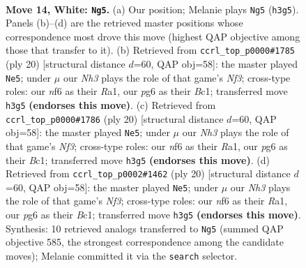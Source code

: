 \documentclass[11pt]{article}
\begin{document}
\clearpage

\begin{figure}[p]\centering
\begin{subfigure}{0.46\textwidth}\centering
\resizebox{\linewidth}{!}{%
\newchessgame
\chessboard[
  setfen={rn1qk2r/p3bp2/b4np1/2pp4/7p/1PN3PN/P2BPPBP/R2Q1RK1 w kq - 0 14},
  showmover=false,
  pgfstyle=straightmove, color=movearrow, markmove={h3-g5}
]}
\caption{}
\end{subfigure}\hfill
\begin{subfigure}{0.46\textwidth}\centering
\resizebox{\linewidth}{!}{%
\newchessgame
\chessboard[
  setfen={1rbqk2r/1pp1bppp/p4n2/3P4/1np5/2N2NP1/PP3PBP/R1BQ1RK1 w k - 1 11},
  showmover=false,
  pgfstyle=straightmove, color=movearrow, markmove={f3-e5}
]}
\caption{}
\end{subfigure}
\\[4pt]
\begin{subfigure}{0.46\textwidth}\centering
\resizebox{\linewidth}{!}{%
\newchessgame
\chessboard[
  setfen={1rbqk2r/1pp1bppp/p4n2/3P4/1np5/2N2NP1/PP3PBP/R1BQ1RK1 w k - 1 11},
  showmover=false,
  pgfstyle=straightmove, color=movearrow, markmove={f3-e5}
]}
\caption{}
\end{subfigure}\hfill
\begin{subfigure}{0.46\textwidth}\centering
\resizebox{\linewidth}{!}{%
\newchessgame
\chessboard[
  setfen={1rbqk2r/1pp1bppp/p4n2/3P4/1np5/2N2NP1/PP3PBP/R1BQ1RK1 w k - 1 11},
  showmover=false,
  pgfstyle=straightmove, color=movearrow, markmove={f3-e5}
]}
\caption{}
\end{subfigure}
\caption{\textbf{Move 14, White: \texttt{Ng5}.} (a) Our position; Melanie plays \texttt{Ng5} (\texttt{h3g5}). Panels (b)--(d) are the retrieved master positions whose correspondence most drove this move (highest QAP objective among those that transfer to it). (b) Retrieved from \texttt{ccrl\_top\_p0000\#1785} (ply 20) [structural distance $d$=60, QAP obj=58]: the master played \texttt{Ne5}; under $\mu$ our \emph{Nh3} plays the role of that game's \emph{Nf3}; cross-type roles: our \emph{n}f6 as their \emph{R}a1, our \emph{p}g6 as their \emph{B}c1; transferred move \texttt{h3g5} \textbf{(endorses this move)}. (c) Retrieved from \texttt{ccrl\_top\_p0000\#1786} (ply 20) [structural distance $d$=60, QAP obj=58]: the master played \texttt{Ne5}; under $\mu$ our \emph{Nh3} plays the role of that game's \emph{Nf3}; cross-type roles: our \emph{n}f6 as their \emph{R}a1, our \emph{p}g6 as their \emph{B}c1; transferred move \texttt{h3g5} \textbf{(endorses this move)}. (d) Retrieved from \texttt{ccrl\_top\_p0002\#1462} (ply 20) [structural distance $d$=60, QAP obj=58]: the master played \texttt{Ne5}; under $\mu$ our \emph{Nh3} plays the role of that game's \emph{Nf3}; cross-type roles: our \emph{n}f6 as their \emph{R}a1, our \emph{p}g6 as their \emph{B}c1; transferred move \texttt{h3g5} \textbf{(endorses this move)}. Synthesis: 10 retrieved analogs transferred to \texttt{Ng5} (summed QAP objective 585, the strongest correspondence among the candidate moves); Melanie committed it via the \texttt{search} selector.}
\label{fig:thought-m26}
\end{figure}
\end{document}
